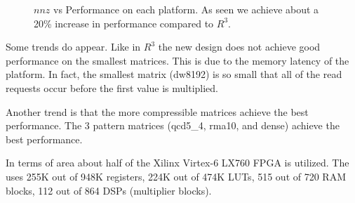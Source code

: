 \begin{figure*}
\caption[SpMV performance on our newest design.]{$nnz$ vs Performance on each platform. As seen we achieve about a 20\% increase in performance compared to $R^3$.}
\label{fig:newResults}
\end{figure*}

Some trends do appear. Like in $R^3$ the new design does not achieve good performance on the smallest matrices. This is due to the memory latency of the platform. In fact, the smallest matrix (dw8192) is so small that all of the read requests occur before the first value is multiplied.

Another trend is that the more compressible matrices achieve the best performance. The 3 pattern matrices (qcd5\_4, rma10, and dense) achieve the best performance.

In terms of area about half of the Xilinx Virtex-6 LX760 FPGA is utilized. The uses 255K out of 948K registers, 224K out of 474K LUTs, 515 out of 720 RAM blocks, 112 out of 864 DSPs (multiplier blocks).
